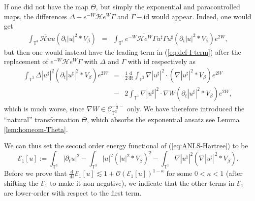 \begin{rem}\label{rem:neces-exp-ansatz}If one did not have the map $\Theta$, but simply
  the exponential and paracontrolled maps, the differences $\Delta - e^{- W}
  \mathcal{H} e^W \Gamma$ and $\Gamma - \mathrm{id}$ would appear. Indeed, one
  would get
  \begin{eqnarray*}
    \int_{\mathbb{T}^3} \overline{\mathcal{H} u} u (\partial_t | u |^2 \ast
    V_{\beta}) & = & \int_{\mathbb{T}^3} \overline{e^{- W} \mathcal{H} e^W
    \Gamma u^{\sharp}} \Gamma u^{\sharp} (\partial_t | u |^2 \ast V_{\beta})
    e^{2 W},
  \end{eqnarray*}
  but then one would instead have the leading term in (\ref{eq:def-I-term})
  after the replacement of $e^{- W} \mathcal{H} e^W \Gamma$ with $\Delta$ and
  $\Gamma$ with $\mathrm{id}$ respectively as
  \begin{eqnarray*} \int_{\mathbb{T}^3} \Delta | u^{\sharp} |^2 (\partial_t | u^{\sharp} |^2
     \ast V_{\beta}) e^{2 W} & = & \frac{1}{2} \frac{\mathrm{d}}{\mathrm{dt}}
     \int_{\mathbb{T}^3} \nabla | u^{\sharp} |^2 \cdot (\nabla | u^{\sharp}
     |^2 \ast V_{\beta}) e^{2 W} \\
     & - & 2 \int_{\mathbb{T}^3} \nabla | u^{\sharp}
     |^2 \cdot \nabla W (\partial_t | u^{\sharp} |^2 \ast V_{\beta}) e^{2 W},
  \end{eqnarray*}
  which is much worse, since $\nabla W \in \mathcal{C}_{\mathbb{T}^3}^{- \frac{1}{2}
  -}$ only. We have therefore introduced the ``natural'' transformation
  $\Theta$, which absorbs the exponential ansatz see Lemma
  \ref{lem:homeom-Theta}. 
\end{rem}

We can thus set the second order energy functional of (\ref{eq:ANLS-Hartree})
to be
\begin{equation}
  \mathcal{E}_1 [u] := \int_{\mathbb{T}^3} | \partial_t u |^2 -
  \int_{\mathbb{T}^3} | u |^2 (| u |^2 \ast V_{\beta})^2 - \int_{\mathbb{T}^3}
  \nabla | u^{\natural} |^2 (\nabla | u^{\natural} |^2 \ast V_{\beta}) .
  \label{high-energy}
\end{equation}
Before we prove that $\frac{\mathrm{d}}{\mathrm{d} t} \mathcal{E}_1 [u] \lesssim 1 +
\mathcal{O} (\mathcal{E}_1 [u])^{1 - \kappa}$ for some $0 < \kappa < 1$ (after
shifting the $\mathcal{E}_1$ to make it non-negative), we indicate that the
other terms in $\mathcal{E}_1$ are lower-order with respect to the first term.

